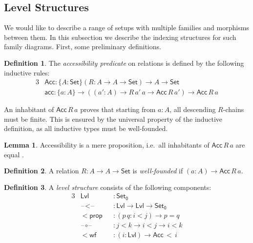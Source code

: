 \documentclass[a4paper,UKenglish,cleveref, autoref, thm-restate]{lipics-v2021}
\theoremstyle{remark}
\theoremstyle{definition}
\newtheorem{mydefinition}{Definition}
\newtheorem{mylemma}{Lemma}
\newcommand{\Set}[1]{\mathsf{Set_{#1}}}
\newcommand{\Seti}{\mathsf{Set}}
\newcommand{\blank}{\mathord{\hspace{1pt}\text{--}\hspace{1pt}}}
\newcommand{\mi}[1]{\mathit{#1}}
\newcommand{\Acc}{\mathsf{Acc}}
\newcommand{\acc}{\mathsf{acc}}
\newcommand{\Lvl}{\mathsf{Lvl}}
\begin{document}
\subsection{Level Structures}
\label{sec:level_structures}

We would like to describe a range of setups with multiple families and morphisms
between them. In this subsection we describe the indexing structures for such
family diagrams. First, some preliminary definitions.

\begin{mydefinition} The \emph{accessibility predicate} on relations is defined by the following
inductive rules:
\begin{alignat*}{3}
  & \Acc : \{A : \Seti\}(R : A \to A \to \Seti) \to A \to \Seti \\
  & \acc : \{a : A\} \to ((\mi{a'} : A) \to R\,\mi{a'}\,a \to \Acc\,R\,\mi{a'}) \to \Acc\,R\,a
\end{alignat*}
\end{mydefinition}

\noindent An inhabitant of $\Acc\,R\,a$ proves that starting from $a : A$, all
descending $R$-chains must be finite. This is ensured by the universal property
of the inductive definition, as all inductive types must be well-founded.

\begin{mylemma}\label{lem:accprop}
Accessibility is a mere proposition, i.e.\ all inhabitants of $\Acc\,R\,a$ are
equal \cite[Lemma 10.3.4]{hottbook}.
\end{mylemma}

\begin{mydefinition}
A relation $R : A \to A \to \Seti$ is \emph{well-founded} if $(a : A) \to
\Acc\,R\,a$.
\end{mydefinition}

\begin{mydefinition} A \emph{level structure} consists of the following components:
\begin{alignat*}{3}
  & \Lvl                  &&: \Set0 \\
  & \blank\!<\!\blank     &&: \Lvl \to \Lvl \to \Set0 \\
  & \mathsf{<\!prop }     &&: (p\,q : i < j) \to p = q \\
  & \blank\!\circ\!\blank &&: j < k \to i < j \to i < k \\
  & \mathsf{<\!wf}        &&: (i : \Lvl) \to \Acc\,<\,i
\end{alignat*}
\end{mydefinition}
\end{document}
